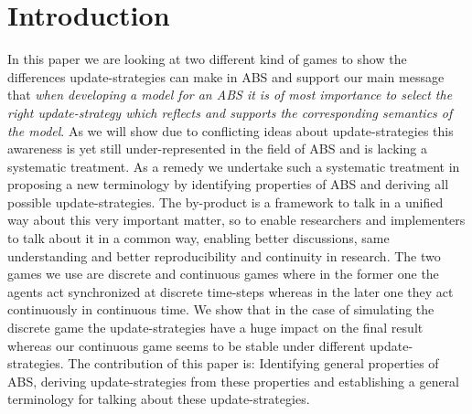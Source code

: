 \section{Introduction}
In this paper we are looking at two different kind of games to show the differences update-strategies can make in ABS and support our main message that \textit{when developing a model for an ABS it is of most importance to select the right update-strategy which reflects and supports the corresponding semantics of the model}. As we will show due to conflicting ideas about update-strategies this awareness is yet still under-represented in the field of ABS and is lacking a systematic treatment. As a remedy we undertake such a systematic treatment in proposing a new terminology by identifying properties of ABS and deriving all possible update-strategies. The by-product is a framework to talk in a unified way about this very important matter, so to enable researchers and implementers to talk about it in a common way, enabling better discussions, same understanding and better reproducibility and continuity in research.
The two games we use are discrete and continuous games where in the former one the agents act synchronized at discrete time-steps whereas in the later one they act continuously in continuous time. We show that in the case of simulating the discrete game the update-strategies have a huge impact on the final result whereas our continuous game seems to be stable under different update-strategies. The contribution of this paper is: Identifying general properties of ABS, deriving update-strategies from these properties and establishing a general terminology for talking about these update-strategies.